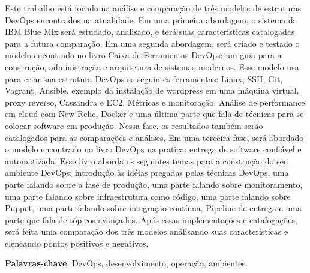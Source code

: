 \begin{resumo}
	Este trabalho está focado na análise e comparação de três modelos  
	de estruturas DevOps encontrados na atualidade. Em uma primeira 
	abordagem, o sistema da IBM Blue Mix será estudado, analisado, e
	terá suas características catalogadas para a futura comparação.
	Em uma segunda abordagem, será criado e testado o modelo encontrado 
	no livro Caixa de Ferramentas DevOps: um guia para a construção, 
	administração e arquitetura de sistemas modernos. Esse modelo usa 
	para criar sua estrutura DevOps as seguintes ferramentas: Linux, 
	SSH, Git, Vagrant, Ansible, exemplo da instalação de wordpress em 
	uma máquina virtual, proxy reverso, Cassandra e EC2, Métricas e 
	monitoração, Análise de performance em cloud com New Relic, Docker 
	e uma última parte que fala de técnicas para se colocar software 
	em produção.  Nessa fase, os 
	resultados também serão catalogados para as comparações e análises.
	Em uma terceira fase, será abordado o modelo encontrado no livro 
	DevOps na pratica: entrega de software confiável e automatizada. 
	Esse livro aborda os seguintes temas para a construção do seu 
	ambiente DevOps: introdução às idéias pregadas pelas técnicas 
	DevOps, uma parte falando sobre a fase de produção, uma parte 
	falando sobre monitoramento, uma parte falando sobre 
	infraestrutura como código, uma parte falando sobre Puppet, 
	uma parte falando sobre integração contínua, Pipeline de entrega 
	e uma parte que fala de tópicos avançados. Após essas implementações 
	e catalogações, será feita uma comparação dos três modelos análisando
	suas características e elencando pontos positivos e negativos.
	
	\vspace{\onelineskip}
	\noindent
	\textbf{Palavras-chave}: DevOps, desenvolvimento, operação, ambientes.
\end{resumo}

